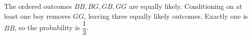 The ordered outcomes $BB,BG,GB,GG$ are equally likely. Conditioning on at least one boy removes $GG$, leaving three equally likely outcomes. Exactly one is $BB$, so the probability is $\boxed{\dfrac{1}{3}}$.
